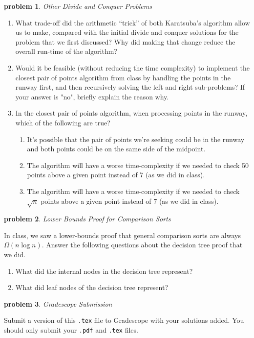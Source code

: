 \documentclass[10pt]{article}
\newtheorem{problem}{\sc\color{cit}problem}
\begin{document}
\begin{problem} Other Divide and Conquer Problems \end{problem}

    \begin{enumerate}   
    	\item What trade-off did the arithmetic “trick” of both Karatsuba's algorithm allow us to make, compared with the initial divide and conquer solutions for the problem that we first discussed? Why did making that change reduce the overall run-time of the algorithm?

        \item Would it be feasible (without reducing the time complexity) to implement the closest pair of points algorithm from class by handling the points in the runway first, and then recursively solving the left and right sub-problems?  If your answer is "no", briefly explain the reason why.

        \item In the closest pair of points algorithm, when processing points in the runway, which of the following are true?
    		\begin{enumerate} 
    		\item It's possible that the pair of points we're seeking could be in the runway and both points could be on the same side of the midpoint.
   		    \item The algorithm will have a worse time-complexity if we needed to check 50 points above a given point instead of 7 (as we did in class).
       		\item The algorithm will have a worse time-complexity if we needed to check $\sqrt{n}$ points above a given point instead of 7 (as we did in class).
    		\end{enumerate} 
    \end{enumerate} 


\begin{problem} Lower Bounds Proof for Comparison Sorts \end{problem}

In class, we saw a lower-bounds proof that general comparison sorts are always $\Omega(n \log n)$. Answer the following questions about the decision tree proof that we did.
    \begin{enumerate}   
    	\item What did the internal nodes in the decision tree represent?

        \item What did leaf nodes of the decision tree represent?
    \end{enumerate}

\begin{problem} Gradescope Submission \end{problem}
Submit a version of this \verb|.tex| file to Gradescope with your solutions added.  You should only submit your \verb|.pdf| and \verb|.tex| files.

%
%
\end{document}
